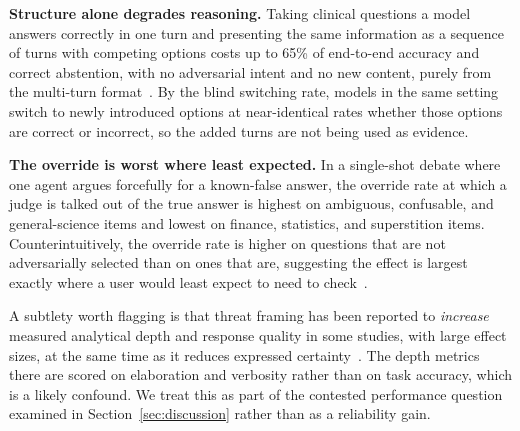 \textbf{Structure alone degrades reasoning.} Taking clinical questions a model answers correctly in one turn and presenting the same information as a sequence of turns with competing options costs up to 65\% of end-to-end accuracy and correct abstention, with no adversarial intent and no new content, purely from the multi-turn format~\citep{StopListeningToMe_Guo}. By the blind switching rate, models in the same setting switch to newly introduced options at near-identical rates whether those options are correct or incorrect, so the added turns are not being used as evidence.

\textbf{The override is worst where least expected.} In a single-shot debate where one agent argues forcefully for a known-false answer, the override rate at which a judge is talked out of the true answer is highest on ambiguous, confusable, and general-science items and lowest on finance, statistics, and superstition items. Counterintuitively, the override rate is higher on questions that are not adversarially selected than on ones that are, suggesting the effect is largest exactly where a user would least expect to need to check~\citep{WhenPersuasionOverridesTruth_Agarwal}.

A subtlety worth flagging is that threat framing has been reported to \emph{increase} measured analytical depth and response quality in some studies, with large effect sizes, at the same time as it reduces expressed certainty~\citep{AnalysisOfThreatBased_Samancioglu}. The depth metrics there are scored on elaboration and verbosity rather than on task accuracy, which is a likely confound. We treat this as part of the contested performance question examined in Section~\ref{sec:discussion} rather than as a reliability gain.

